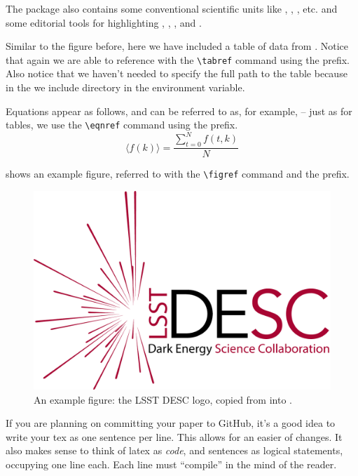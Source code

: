 \documentclass[\docopts]{\docclass}
\begin{document}
The  package also contains some conventional scientific units like \angstrom, \GeV, \Msun, etc. and some editorial tools for highlighting , , , and .


Similar to the figure before, here we have included a table of data from .
Notice that again we are able to reference  with the \verb=\tabref= command using the  prefix.
Also notice that we haven't needed to specify the full path to the table because in the  we include  directory in the  environment variable.



Equations appear as follows, and can be referred to as, for example,  -- just as for tables, we use the \verb=\eqnref= command using the  prefix.
\begin{equation}
  \label{eqn:example}
  \langle f(k) \rangle = \frac{ \sum_{t=0}^{N}f(t,k) }{N}
\end{equation}


 shows an example figure, referred to with the \verb=\figref= command and the  prefix.

\begin{figure}
\includegraphics[width=0.9\columnwidth]{example.png}
\caption{An example figure: the LSST DESC logo, copied from  into . \label{fig:example}}
\end{figure}

If you are planning on committing your paper to GitHub, it's a good idea to write your tex as one sentence per line.
This allows for an easier  of changes.
It also makes sense to think of latex as \emph{code}, and sentences as logical statements, occupying one line each.
Each line must ``compile'' in the mind of the reader.
\end{document}
